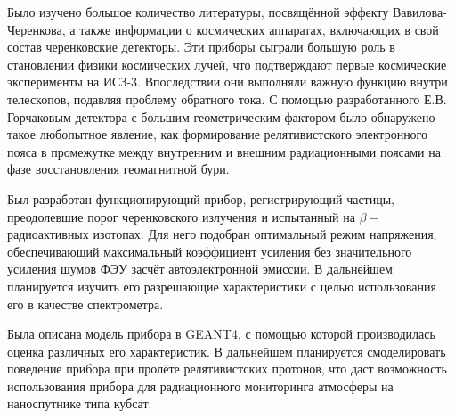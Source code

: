 \documentclass[12pt,a4paper]{report} %
\begin{document}
Было изучено большое количество литературы, посвящённой эффекту Вавилова-Черенкова, а также информации о космических аппаратах, включающих в свой состав черенковские детекторы. Эти приборы сыграли большую роль в становлении физики космических лучей, что подтверждают первые космические эксперименты на ИСЗ-3. Впоследствии они выполняли важную функцию внутри телескопов, подавляя проблему обратного тока.
С помощью разработанного Е.В. Горчаковым детектора с большим геометрическим фактором было обнаружено такое любопытное явление, как формирование релятивистского электронного пояса в промежутке между внутренним и внешним радиационными поясами на фазе восстановления геомагнитной бури. 

Был разработан функционирующий прибор, регистрирующий частицы, преодолевшие порог черенковского излучения и испытанный на $\beta-$радиоактивных изотопах. Для него подобран оптимальный режим напряжения, обеспечивающий максимальный коэффициент усиления без значительного усиления шумов ФЭУ засчёт автоэлектронной эмиссии. В дальнейшем планируется изучить его разрешающие характеристики с целью использования его в качестве спектрометра.

Была описана модель прибора в GEANT4, с помощью которой производилась оценка различных его характеристик. В дальнейшем планируется смоделировать поведение прибора при пролёте релятивистских протонов, что даст возможность использования прибора для радиационного мониторинга атмосферы на наноспутнике типа кубсат.

\end{document}
